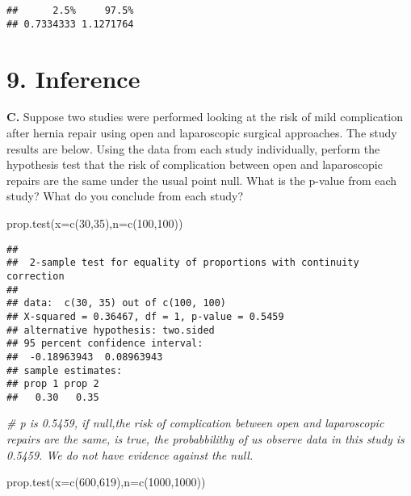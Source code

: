 \documentclass[
]{article}
\newenvironment{Shaded}{\begin{snugshade}}{\end{snugshade}}
\newcommand{\AttributeTok}[1]{\textcolor[rgb]{0.77,0.63,0.00}{#1}}
\newcommand{\CommentTok}[1]{\textcolor[rgb]{0.56,0.35,0.01}{\textit{#1}}}
\newcommand{\DecValTok}[1]{\textcolor[rgb]{0.00,0.00,0.81}{#1}}
\newcommand{\FunctionTok}[1]{\textcolor[rgb]{0.00,0.00,0.00}{#1}}
\newcommand{\NormalTok}[1]{#1}
\begin{document}
\begin{verbatim}
##      2.5%     97.5% 
## 0.7334333 1.1271764
\end{verbatim}

\hypertarget{inference}{%
\section{9. Inference}\label{inference}}

\textbf{C.} Suppose two studies were performed looking at the risk of
mild complication after hernia repair using open and laparoscopic
surgical approaches. The study results are below. Using the data from
each study individually, perform the hypothesis test that the risk of
complication between open and laparoscopic repairs are the same under
the usual point null. What is the p-value from each study? What do you
conclude from each study?

\begin{Shaded}
\begin{Highlighting}[]
\FunctionTok{prop.test}\NormalTok{(}\AttributeTok{x=}\FunctionTok{c}\NormalTok{(}\DecValTok{30}\NormalTok{,}\DecValTok{35}\NormalTok{),}\AttributeTok{n=}\FunctionTok{c}\NormalTok{(}\DecValTok{100}\NormalTok{,}\DecValTok{100}\NormalTok{))}
\end{Highlighting}
\end{Shaded}

\begin{verbatim}
## 
##  2-sample test for equality of proportions with continuity correction
## 
## data:  c(30, 35) out of c(100, 100)
## X-squared = 0.36467, df = 1, p-value = 0.5459
## alternative hypothesis: two.sided
## 95 percent confidence interval:
##  -0.18963943  0.08963943
## sample estimates:
## prop 1 prop 2 
##   0.30   0.35
\end{verbatim}

\begin{Shaded}
\begin{Highlighting}[]
\CommentTok{\# p is 0.5459, if null,the risk of complication between open and laparoscopic repairs are the same, is true, the probabbilithy of us observe data in this study is 0.5459. We do not have evidence against the null.}
\end{Highlighting}
\end{Shaded}

\begin{Shaded}
\begin{Highlighting}[]
\FunctionTok{prop.test}\NormalTok{(}\AttributeTok{x=}\FunctionTok{c}\NormalTok{(}\DecValTok{600}\NormalTok{,}\DecValTok{619}\NormalTok{),}\AttributeTok{n=}\FunctionTok{c}\NormalTok{(}\DecValTok{1000}\NormalTok{,}\DecValTok{1000}\NormalTok{))}
\end{Highlighting}
\end{Shaded}
\end{document}
